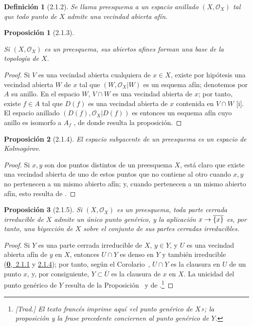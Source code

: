 \documentclass[oneside]{amsart}
\theoremstyle{ega-env-style}
\theoremstyle{ega-thm-env-style}
\newtheorem*{proposition}{Proposición}
\theoremstyle{ega-defn-env-style}
\newtheorem*{definition}{Definición}
\renewcommand{\to}{\mathchoice{\longrightarrow}{\rightarrow}{\rightarrow}{\rightarrow}}
\newcommand{\oldpage}[2][]{{\marginnote{\normalfont{\textbf{#1}~|~#2}}}\ignorespaces}
\let\EGAOriginalLabel\label
\renewcommand{\label}[1]{\phantomsection\EGAOriginalLabel{#1}}
\begin{document}
\begin{definition}[2.1.2]
\label{I.2.1.2}
Se llama preesquema a un espacio anillado $(X,\mathscr{O}_X)$ tal que todo punto de $X$ admite una vecindad abierta afín.
\end{definition}


\oldpage[I]{98}
\begin{proposition}[2.1.3]
\label{I.2.1.3}

Si $(X,\mathscr{O}_X)$ es un preesquema, sus abiertos afines forman una base de la topología de $X$.
\end{proposition}

\begin{proof}
Si $V$ es una vecindad abierta cualquiera de $x\in X$, existe por hipótesis una vecindad abierta $W$ de $x$ tal que $(W,\mathscr{O}_X|W)$ es un esquema afín;
denotemos por $A$ su anillo.
En el espacio $W$, $V\cap W$ es una vecindad abierta de $x$;
por tanto, existe $f\in A$ tal que $D(f)$ es una vecindad abierta de $x$ contenida en $V\cap W$ [i].
El espacio anillado $(D(f),\mathscr{O}_X|D(f))$ es entonces un esquema afín cuyo anillo es isomorfo a $A_f$ , de donde resulta la proposición.
\end{proof}

\begin{proposition}[2.1.4]
\label{I.2.1.4}
El espacio subyacente de un preesquema es un espacio de Kolmogórov.
\end{proposition}

\begin{proof}
Si $x,y$ son dos puntos distintos de un preesquema $X$, está claro que existe una vecindad abierta de uno de estos puntos que no contiene al otro cuando $x,y$ no pertenecen a un mismo abierto afín; y, cuando pertenecen a un mismo abierto afín, esto resulta de .
\end{proof}

\begin{proposition}[2.1.5]
\label{I.2.1.5}
Si $(X,\mathscr{O}_X)$ es un preesquema, toda parte cerrada irreducible de $X$ admite un único punto genérico, y la aplicación $x\to\overline{\{x\}}$ es, por tanto, una biyección de $X$ sobre el conjunto de sus partes cerradas irreducibles.
\end{proposition}

\begin{proof}
Si $Y$ es una parte cerrada irreducible de $X$, $y\in Y$, y $U$ es una vecindad abierta afín de $y$ en $X$, entonces $U\cap Y$ es denso en $Y$ y también irreducible (\hyperref[0.2.1.1]{\textbf{0},~2.1.1} y \hyperref[0.2.1.4]{2.1.4});
por tanto, según el Corolario~, $U\cap Y$ es la clausura en $U$ de un punto $x$, y, por consiguiente, $Y\subset\overline{U}$ es la clausura de $x$ en $X$.
La unicidad del punto genérico de $Y$ resulta de la Proposición~ y de .\footnote{\emph{[Trad.] El texto francés imprime aquí «el punto genérico de $X$»; la proposición y la frase precedente conciernen al punto genérico de $Y$.}}
\end{proof}
\end{document}
